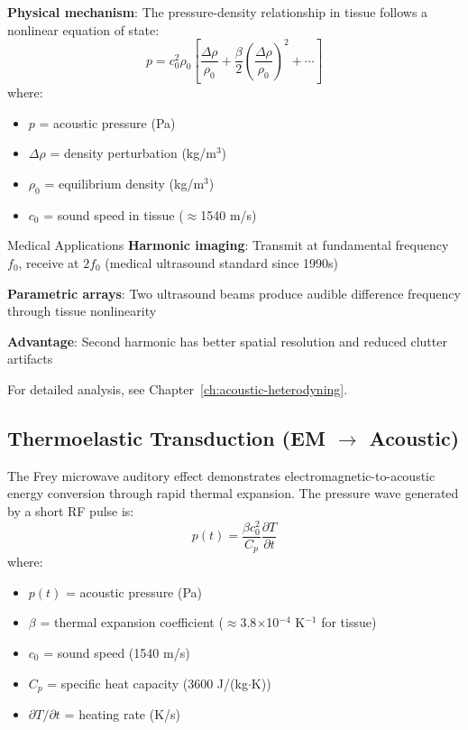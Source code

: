 \begin{scope}[shift={(8,0)}]
\textbf{Physical mechanism}: The pressure-density relationship in tissue follows a nonlinear equation of state:
\begin{equation}
\label{eq:pressure-density}
p = c_0^2 \rho_0 \left[\frac{\Delta\rho}{\rho_0} + \frac{\beta}{2}\left(\frac{\Delta\rho}{\rho_0}\right)^2 + \cdots\right]
\end{equation}
where:
\begin{itemize}
\item $p$ = acoustic pressure (Pa)
\item $\Delta\rho$ = density perturbation (kg/m$^3$)
\item $\rho_0$ = equilibrium density (kg/m$^3$)
\item $c_0$ = sound speed in tissue ($\approx$1540 m/s)
\end{itemize}

\begin{calloutbox}{Medical Applications}
\textbf{Harmonic imaging}: Transmit at fundamental frequency $f_0$, receive at $2f_0$ (medical ultrasound standard since 1990s)

\textbf{Parametric arrays}: Two ultrasound beams produce audible difference frequency through tissue nonlinearity

\textbf{Advantage}: Second harmonic has better spatial resolution and reduced clutter artifacts
\end{calloutbox}

For detailed analysis, see Chapter~\ref{ch:acoustic-heterodyning}.

\subsection{Thermoelastic Transduction (EM $\rightarrow$ Acoustic)}

The Frey microwave auditory effect demonstrates electromagnetic-to-acoustic energy conversion through rapid thermal expansion. The pressure wave generated by a short RF pulse is:
\begin{equation}
\label{eq:thermoelastic-pressure}
p(t) = \frac{\beta c_0^2}{C_p} \frac{\partial T}{\partial t}
\end{equation}
where:
\begin{itemize}
\item $p(t)$ = acoustic pressure (Pa)
\item $\beta$ = thermal expansion coefficient ($\approx$3.8$\times$10$^{-4}$ K$^{-1}$ for tissue)
\item $c_0$ = sound speed (1540 m/s)
\item $C_p$ = specific heat capacity (3600 J/(kg$\cdot$K))
\item $\partial T/\partial t$ = heating rate (K/s)
\end{itemize}


\end{scope}
